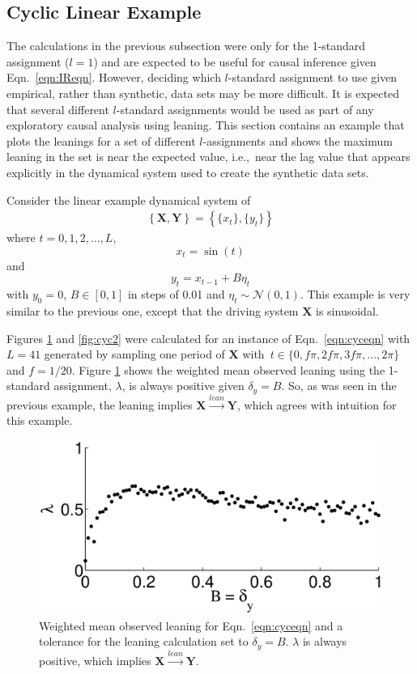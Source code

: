 \documentclass[twocolumn,aps,pre,groupedaddress]{revtex4-1}
\begin{document}
\subsection{Cyclic Linear Example}
The calculations in the previous subsection were only for the 1-standard assignment ($l=1$) and are expected to be useful for causal inference given Eqn.\ \ref{eqn:IReqn}.  However, deciding which $l$-standard assignment to use given empirical, rather than synthetic, data sets may be more difficult.  It is expected that several different $l$-standard assignments would be used as part of any exploratory causal analysis using leaning.  This section contains an example that plots the leanings for a set of different $l$-assignments and shows the maximum leaning in the set is near the expected value, i.e.,\ near the lag value that appears explicitly in the dynamical system used to create the synthetic data sets. 

Consider the linear example dynamical system of
\begin{eqnarray}
\label{eqn:cyceqn}
\left\{\mathbf{X},\mathbf{Y}\right\} = \left\{\{x_t\},\{y_t\}\right\}
\end{eqnarray}
where $t=0,1,2,\ldots,L$,
\begin{equation*}
x_t = \sin(t)
\end{equation*}
and
\begin{equation*}
y_t = x_{t-1} + B\eta_t
\end{equation*}
with $y_0 = 0$, $B\in[0,1]$ in steps of 0.01 and $\eta_t\sim\mathcal{N}\left(0,1\right)$.  This example is very similar to the previous one, except that the driving system $\mathbf{X}$ is sinusoidal.

Figures \ref{fig:cyc1} and \ref{fig:cyc2} were calculated for an instance of Eqn.\ \ref{eqn:cyceqn} with $L=41$ generated by sampling one period of $\mathbf{X}$ with\ $t\in\{0,f\pi,2f\pi,3f\pi,\ldots,2\pi\}$ and $f=1/20$.  Figure \ref{fig:cyc1} shows the weighted mean observed leaning using the 1-standard assignment, $\lambda$, is always positive given $\delta_y=B$.  So, as was seen in the previous example, the leaning implies $\mathbf{X}\xrightarrow{lean}\mathbf{Y}$, which agrees with intuition for this example. 
\begin{figure}[ht]
\includegraphics[scale=0.47]{SimpleCyclicexample_Bxytol.eps}
\caption{Weighted mean observed leaning for Eqn.\ \ref{eqn:cyceqn} and a tolerance for the leaning calculation set to $\delta_y=B$.  $\lambda$ is always positive, which implies $\mathbf{X}\xrightarrow{lean}\mathbf{Y}$.}
\label{fig:cyc1}
\end{figure}
\end{document}
